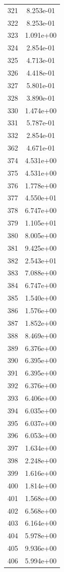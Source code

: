 \documentclass[12pt]{article}
\begin{document}
\begin{longtable}{@{}cc@{}}
321 & 8.253e-01 \\
322 & 8.253e-01 \\
323 & 1.091e+00 \\
324 & 2.854e-01 \\
325 & 4.713e-01 \\
326 & 4.418e-01 \\
327 & 5.801e-01 \\
328 & 3.890e-01 \\
330 & 1.474e+00 \\
331 & 5.787e-01 \\
332 & 2.854e-01 \\
362 & 4.671e-01 \\
374 & 4.531e+00 \\
375 & 4.531e+00 \\
376 & 1.778e+00 \\
377 & 4.550e+01 \\
378 & 6.747e+00 \\
379 & 1.105e+01 \\
380 & 8.005e+00 \\
381 & 9.425e+00 \\
382 & 2.543e+01 \\
383 & 7.088e+00 \\
384 & 6.747e+00 \\
385 & 1.540e+00 \\
386 & 1.576e+00 \\
387 & 1.852e+00 \\
388 & 8.469e+00 \\
389 & 6.376e+00 \\
390 & 6.395e+00 \\
391 & 6.395e+00 \\
392 & 6.376e+00 \\
393 & 6.406e+00 \\
394 & 6.035e+00 \\
395 & 6.037e+00 \\
396 & 6.053e+00 \\
397 & 1.634e+00 \\
398 & 2.248e+00 \\
399 & 1.616e+00 \\
400 & 1.814e+00 \\
401 & 1.568e+00 \\
402 & 6.568e+00 \\
403 & 6.164e+00 \\
404 & 5.978e+00 \\
405 & 9.936e+00 \\
406 & 5.994e+00 \\

\end{longtable}
\end{document}
